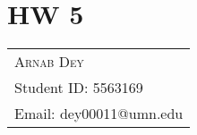 \section{HW 5}
\begin{tabularx}{\textwidth}{l}
	\hspace*{-0.8cm}\large\textsc{Arnab Dey}\\
	\hspace*{-0.8cm}Student ID: 5563169\\
	\hspace*{-0.8cm}Email: dey00011@umn.edu\\
\end{tabularx}
\bigskip
\par